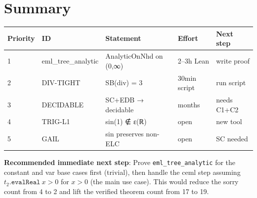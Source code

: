 \documentclass[12pt]{article}
\theoremstyle{definition}
\begin{document}
\section{Summary}

\begin{center}
\begin{tabular}{lllll}
\toprule
Priority & ID & Statement & Effort & Next step \\
\midrule
1 & eml\_tree\_analytic & AnalyticOnNhd on (0,∞) & 2–3h Lean & write proof \\
2 & DIV-TIGHT & SB(div) = 3 & 30min script & run script \\
3 & DECIDABLE & SC+EDB → decidable & months & needs C1+C2 \\
4 & TRIG-L1 & sin(1) ∉ ε(ℝ) & open & new tool \\
5 & GAIL & sin preserves non-ELC & open & SC needed \\
\bottomrule
\end{tabular}
\end{center}

\textbf{Recommended immediate next step}: Prove \texttt{eml\_tree\_analytic} for
the constant and var base cases first (trivial), then handle the ceml step assuming
$t_2.\texttt{evalReal}\ x > 0$ for $x > 0$ (the main use case).
This would reduce the sorry count from 4 to 2 and lift the verified theorem count
from 17 to 19.
\end{document}
